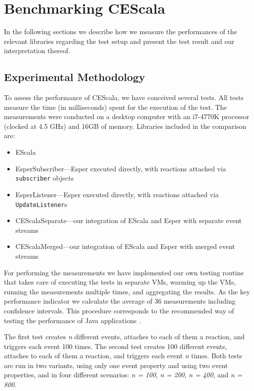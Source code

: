 \documentclass[book,type=bsc,colorback,accentcolor=tud8b,12pt,twoside]{tudthesis}
\begin{document}
\section{Benchmarking CEScala}
\label{sec:benchmarking-cescala}

In the following sections we describe how we measure the performances of the relevant libraries regarding the test setup and present the test result and our interpretation thereof.  

\subsection{Experimental Methodology}
\label{sec:experimental-methodology}

To assess the performance of CEScala, we have conceived several tests.  All tests measure the time (in milliseconds) spent for the execution of the test.  The measurements were conducted on a desktop computer with an i7-4770K processor (clocked at 4.5 GHz) and 16GB of memory.  Libraries included in the comparison are:

\begin{itemize}
  \item EScala
  \item EsperSubscriber---Esper executed directly, with reactions attached via \mbox{\texttt{subscriber}} objects
  \item EsperListener---Esper executed directly, with reactions attached via \mbox{\texttt{UpdateListener}}s
  \item CEScalaSeparate---our integration of EScala and Esper with separate event streams
  \item CEScalaMerged---our integration of EScala and Esper with merged event streams
\end{itemize}

For performing the measurements we have implemented our own testing routine that takes care of executing the tests in separate VMs, warming up the VMs, running the measurements multiple times, and aggregating the results.  As the key performance indicator we calculate the average of 36 measurements including confidence intervals.  This procedure corresponds to the recommended way of testing the performance of Java applications \cite{Georges:2007br}.  

The first test creates \emph{n} different events, attaches to each of them a reaction, and triggers each event 100 times.  The second test creates 100 different events, attaches to each of them a reaction, and triggers each event \emph{n} times.  Both tests are run in two variants, using only one event property and using two event properties, and in four different scenarios: \emph{n = 100}, \emph{n = 200}, \emph{n = 400}, and \emph{n = 800}.  
\end{document}
